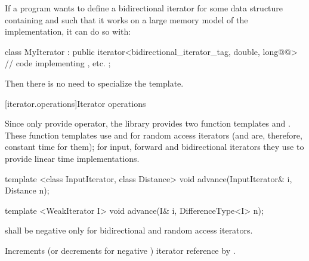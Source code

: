 \pnum
\enterexample
If a \Cpp program wants to define a bidirectional iterator for some data structure containing
and such that it
works on a large memory model of the implementation, it can do so with:

\begin{codeblock}
class MyIterator :
  public iterator<bidirectional_iterator_tag, double, long@@> {
  // code implementing \tcode{++}, etc.
};
\end{codeblock}

\pnum
Then there is no need to specialize the
\added{, }
  template.
\exitexample

[iterator.operations]{Iterator operations}

\pnum
Since only  provide
\tcode{+} 
\tcode{-}
operator, the library provides two
function templates
and
.
These
function templates
use
\tcode{+}
and
\tcode{-}
for random access iterators (and are, therefore, constant
time for them); for input, forward and bidirectional iterators they use
\tcode{++}
to provide linear time
implementations.

%
\begin{removedblock}
\begin{itemdecl}
template <class InputIterator, class Distance>
  void advance(InputIterator& i, Distance n);
\end{itemdecl}
\end{removedblock}
\begin{addedblock}
\begin{itemdecl}
template <WeakIterator I>
  void advance(I& i, DifferenceType<I> n);
\end{itemdecl}
\end{addedblock}

\begin{itemdescr}
\pnum
\requires
{}
shall be negative only for bidirectional and random access iterators.

\pnum
\effects
Increments (or decrements for negative
)
iterator reference
by
.
\end{itemdescr}

